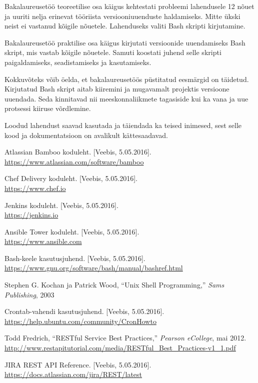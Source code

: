 \documentclass[12pt]{article}
\begin{document}
  Bakalaureusetöö teoreetilise osa käigus kehtestati probleemi lahendusele 12 nõuet ja uuriti nelja erinevat tööriista versiooniuuenduste haldamiseks. Mitte ükski neist ei vastanud kõigile nõuetele. Lahenduseks valiti Bash skripti kirjutamine.
  
  Bakalaureusetöö praktilise osa käigus kirjutati versioonide uuendamiseks Bash skript, mis vastab kõigile nõuetele. Samuti koostati juhend selle skripti paigaldamiseks, seadistamiseks ja kasutamiseks.
  
  Kokkuvõteks võib öelda, et bakalaureusetöös püstitatud eesmärgid on täidetud. Kirjutatud Bash skript aitab kiiremini ja mugavamalt projektis versioone uuendada. Seda kinnitavad nii meeskonnaliikmete tagasiside kui ka vana ja uue protsessi kiiruse võrdlemine.
  
  Loodud lahendust saavad kasutada ja täiendada ka teised inimesed, sest selle kood ja dokumentatsioon on avalikult kättesaadavad.

  \newpage
  
  \begin{thebibliography}{9}
    \label{kasutatud-materjalid}
    
    Atlassian Bamboo koduleht. [Veebis, 5.05.2016].\\
    \url{https://www.atlassian.com/software/bamboo}
    
    Chef Delivery koduleht. [Veebis, 5.05.2016].\\
    \url{https://www.chef.io}
  
    Jenkins koduleht. [Veebis, 5.05.2016].\\
    \url{https://jenkins.io}
  
    Ansible Tower koduleht. [Veebis, 5.05.2016].\\
    \url{https://www.ansible.com}
  
    Bash-keele kasutusjuhend. [Veebis, 5.05.2016].\\
    \url{https://www.gnu.org/software/bash/manual/bashref.html}
    
     Stephen G. Kochan ja Patrick Wood, ``Unix Shell Programming,'' \textit{Sams Publishing}, 2003
     
    Crontab-vahendi kasutusjuhend. [Veebis, 5.05.2016].\\
    \url{https://help.ubuntu.com/community/CronHowto}
    
    Todd Fredrich, ``RESTful Service Best Practices,'' \textit{Pearson eCollege}, mai 2012.\\
    \url{http://www.restapitutorial.com/media/RESTful_Best_Practices-v1_1.pdf}
    
    JIRA REST API Reference. [Veebis, 5.05.2016].\\
    \url{https://docs.atlassian.com/jira/REST/latest}
 
  \end{thebibliography}
\end{document}

